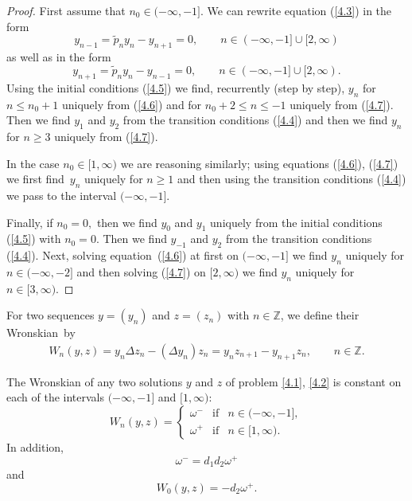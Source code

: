 \begin{proof}
First assume that $n_{0}\in (-\infty ,-1].$ We can rewrite equation (\ref{4.3}) in the form%
\begin{equation}
y_{n-1}=\widetilde{p}_{n}y_{n}-y_{n+1}=0,\qquad n\in (-\infty ,-1]\cup
\lbrack 2,\infty )  \label{4.6}
\end{equation}%
as well as in the form%
\begin{equation}
y_{n+1}=\widetilde{p}_{n}y_{n}-y_{n-1}=0,\qquad n\in (-\infty ,-1]\cup
\lbrack 2,\infty ).  \label{4.7}
\end{equation}%
Using the initial conditions (\ref{4.5}) we f\/ind, recurrently (step by
step), $y_{n}$ for $n\leq n_{0}+1$ uniquely from (\ref{4.6}) and for $%
n_{0}+2\leq n\leq -1$ uniquely from (\ref{4.7}). Then we f\/ind $y_{1}$ and $%
y_{2}$ from the transition conditions (\ref{4.4}) and then we f\/ind $y_{n}$
for $n\geq 3$ uniquely from (\ref{4.7}).

In the case $n_{0}\in \lbrack 1,\infty )$ we are reasoning similarly; using
equations (\ref{4.6}), (\ref{4.7}) we f\/irst f\/ind~$y_{n}$ uniquely for $n\geq
1$ and then using the transition conditions (\ref{4.4}) we pass to the
interval $(-\infty ,-1].$

Finally, if $n_{0}=0,$ then we f\/ind $y_{0}$ and $y_{1}$ uniquely from the
initial conditions (\ref{4.5}) with $n_{0}=0$. Then we f\/ind $y_{-1}$ and $%
y_{2}$ from the transition conditions (\ref{4.4}). Next, solving equation~(\ref{4.6}) at f\/irst on $(-\infty ,-1]$ we f\/ind $y_{n}$ uniquely for $n\in
(-\infty ,-2]$ and then solving (\ref{4.7}) on $[2,\infty )$ we f\/ind $y_{n}$
uniquely for $n\in \lbrack 3,\infty ).$
\end{proof}

\begin{definition}
\label{Def4.2}For two sequences $y=(y_{n})$ and $z=(z_{n})$ with $n\in
\mathbb{Z}
$, we def\/ine their Wronskian~by%
\begin{gather*}
W_{n}(y,z) = y_{n}\Delta z_{n}-(\Delta y_{n})z_{n}  = y_{n}z_{n+1}-y_{n+1}z_{n},\qquad n\in
\mathbb{Z}
.
\end{gather*}
\end{definition}

\begin{theorem}
\label{Th4.3} The Wronskian of any two solutions $y$ and $z$ of problem \eqref{4.1}, \eqref{4.2} is constant on each of the intervals $(-\infty ,-1]$ and
$[1,\infty )$:
\begin{equation}
W_{n}(y,z)=\left\{
\begin{array}{lll}
\omega ^{-} & \text{if} & n\in (-\infty ,-1], \\
\omega ^{+} & \text{if} & n\in \lbrack 1,\infty ).%
\end{array}%
\right.  \label{4.8}
\end{equation}%
In addition,
\begin{equation}
\omega ^{-}=d_{1}d_{2}\omega ^{+}  \label{4.9}
\end{equation}%
and%
\begin{equation}
W_{0}(y,z)=-d_{2}\omega ^{+}.  \label{4.10}
\end{equation}
\end{theorem}

